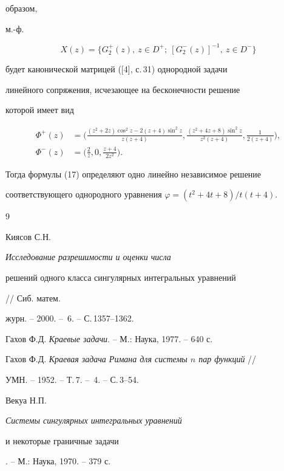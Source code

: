 \begin{examnonum}
образом, 


м.-ф. 


$$ 


X(z)=\{G^+_2(z),\ z\in D^+;\ [G^-_2(z)]^{-1},\ z\in D^-\} 


$$ 


будет канонической матрицей ([4], с.\,31) однородной задачи 


линейного сопряжения, исчезающее на бесконечности решение 


которой имеет вид 


\begin{align*} 


\Phi^+(z)&=\bigg(\frac{(z^2+2z)\cos^2z-2(z+4)\sin^2z} 


{z(z+4)},\frac{(z^2+4z+8)\sin^2z}{z^2(z+4)}, 


\frac{1}{2(z+4)}\bigg),\\ 


% 


\Phi^-(z)&=\bigg(\frac{2}{z},0,\frac{z+4}{2z^2} \bigg). 


\end{align*} 


Тогда формулы (17) определяют одно линейно независимое решение 


соответствующего однородного уравнения $\varphi=(t^2+4t+8)/t(t+4)$. 


\end{examnonum}  


 


\begin{thebibliography}{9} 


 




Киясов С.Н. {\em Исследование разрешимости и оценки числа 


решений одного класса сингулярных интегральных уравнений} // Сиб. матем. 


журн. -- 2000. -- \No\,6. -- С.\,1357--1362. 




Гахов Ф.Д. {\em Краевые задачи}. -- М.: Наука, 1977. -- 640 с. 




Гахов Ф.Д. {\em Краевая задача Римана для системы $n$ пар функций} // 


УМН. -- 1952. -- Т.\,7. -- \No\,4. -- С.\,3--54. 




Векуа Н.П. {\em Системы сингулярных интегральных уравнений 


и некоторые граничные задачи}. -- М.: Наука, 1970. -- 379 с. 


 


\end{thebibliography} 


 


\vskip 2cm 


 






 


\label{end} 


 


 


